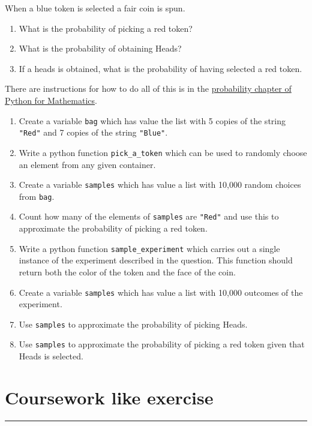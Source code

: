 \documentclass{article}
\begin{document}
When a blue token is selected a fair coin is spun.

\begin{enumerate}
    \item What is the probability of picking a red token?
    \item What is the probability of obtaining Heads?
    \item If a heads is obtained, what is the probability of having selected a red token.
\end{enumerate}

There are instructions for how to do all of this is in the
\href{https://vknight.org/pfm/tools-for-mathematics/06-probability/how/main.html}{probability chapter of Python for Mathematics}.


\begin{enumerate}
    \item Create a variable \texttt{bag} which has value the
        list with 5 copies of the string \texttt{"Red"} and 7
        copies of the string \texttt{"Blue"}.
    \item Write a python function \texttt{pick_a_token} which can be
        used to randomly choose an element from any given container.
    \item Create a variable \texttt{samples} which has value a list
        with 10,000 random choices from \texttt{bag}.
    \item Count how many of the elements of \texttt{samples} are
        \texttt{"Red"} and use this to approximate the probability of
        picking a red token.
    \item Write a python function \texttt{sample_experiment} which
        carries out a single instance of the experiment described in the
        question. This function should return both the color of the token and
        the face of the coin.
    \item Create a variable \texttt{samples} which has value a list
        with 10,000 outcomes of the experiment.
    \item Use \texttt{samples} to approximate the probability of picking
        Heads.
    \item Use \texttt{samples} to approximate the probability of picking
        a red token given that Heads is selected.
\end{enumerate}


\section{Coursework like exercise}
\hrule
\end{document}
